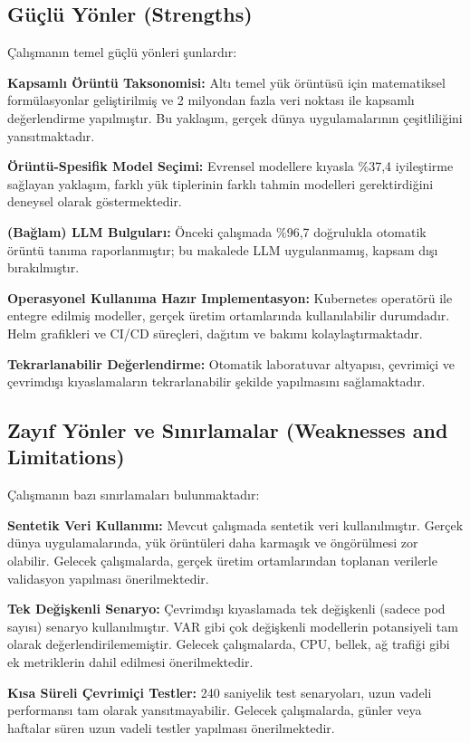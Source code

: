 \subsection{Güçlü Yönler (Strengths)}

Çalışmanın temel güçlü yönleri şunlardır:

\textbf{Kapsamlı Örüntü Taksonomisi:} Altı temel yük örüntüsü için matematiksel formülasyonlar geliştirilmiş ve 2 milyondan fazla veri noktası ile kapsamlı değerlendirme yapılmıştır. Bu yaklaşım, gerçek dünya uygulamalarının çeşitliliğini yansıtmaktadır.

\textbf{Örüntü-Spesifik Model Seçimi:} Evrensel modellere kıyasla \%37,4 iyileştirme sağlayan yaklaşım, farklı yük tiplerinin farklı tahmin modelleri gerektirdiğini deneysel olarak göstermektedir.

\textbf{(Bağlam) LLM Bulguları:} Önceki çalışmada \%96,7 doğrulukla otomatik örüntü tanıma raporlanmıştır; bu makalede LLM uygulanmamış, kapsam dışı bırakılmıştır.

\textbf{Operasyonel Kullanıma Hazır Implementasyon:} Kubernetes operatörü ile entegre edilmiş modeller, gerçek üretim ortamlarında kullanılabilir durumdadır. Helm grafikleri ve CI/CD süreçleri, dağıtım ve bakımı kolaylaştırmaktadır.

\textbf{Tekrarlanabilir Değerlendirme:} Otomatik laboratuvar altyapısı, çevrimiçi ve çevrimdışı kıyaslamaların tekrarlanabilir şekilde yapılmasını sağlamaktadır.

\subsection{Zayıf Yönler ve Sınırlamalar (Weaknesses and Limitations)}

Çalışmanın bazı sınırlamaları bulunmaktadır:

\textbf{Sentetik Veri Kullanımı:} Mevcut çalışmada sentetik veri kullanılmıştır. Gerçek dünya uygulamalarında, yük örüntüleri daha karmaşık ve öngörülmesi zor olabilir. Gelecek çalışmalarda, gerçek üretim ortamlarından toplanan verilerle validasyon yapılması önerilmektedir.

\textbf{Tek Değişkenli Senaryo:} Çevrimdışı kıyaslamada tek değişkenli (sadece pod sayısı) senaryo kullanılmıştır. VAR gibi çok değişkenli modellerin potansiyeli tam olarak değerlendirilememiştir. Gelecek çalışmalarda, CPU, bellek, ağ trafiği gibi ek metriklerin dahil edilmesi önerilmektedir.

\textbf{Kısa Süreli Çevrimiçi Testler:} 240 saniyelik test senaryoları, uzun vadeli performansı tam olarak yansıtmayabilir. Gelecek çalışmalarda, günler veya haftalar süren uzun vadeli testler yapılması önerilmektedir.

